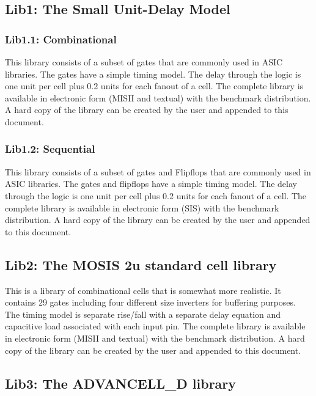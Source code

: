 {\begin{pespace}
\subsection{ Lib1: The Small Unit-Delay Model}

\subsubsection{ Lib1.1: Combinational}

This library consists of a subset of gates that are commonly used in 
ASIC libraries.  The gates have a simple timing model.
The delay through the logic is one unit per cell plus 0.2 units for
each fanout of a cell.
The complete library is available in electronic form  (MISII and textual)
with the benchmark distribution. 
A hard copy of the library can be created by the user and appended to this
document.

\subsubsection{ Lib1.2: Sequential }

This library consists of a subset of gates  and Flipflops 
that are commonly used in 
ASIC libraries.  The gates and flipflops have a simple timing model.
The delay through the logic is one unit per cell plus 0.2 units for
each fanout of a cell.
The complete library is available in electronic form  (SIS)
with the benchmark distribution. 
A hard copy of the library can be created by the user and appended to this
document.


\subsection{ Lib2: The MOSIS 2u standard cell library}

This is a library of combinational cells that
is somewhat more realistic.
It contains 29 gates including four different size inverters
for buffering purposes.  The timing model is separate rise/fall with
a separate delay equation and capacitive load associated with each
input pin.
The complete library is available in electronic form (MISII and textual)
with the benchmark distribution.
A hard copy of the library can be created by the user and appended to this
document.


\subsection{ Lib3: The ADVANCELL\_D library}


\end{pespace}}
